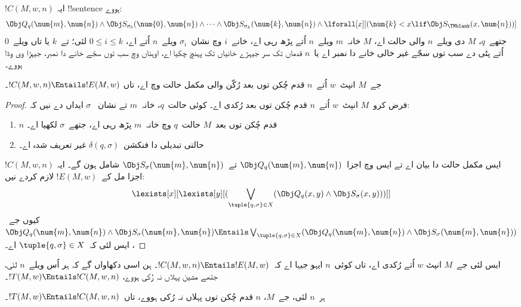 \documentclass[../../../include/open-logic-section]{subfiles}
\begin{document}
\begin{defn} 
$!C(M, w, n)$ ایہ !!{sentence} ہووے:
\[ 
\Obj Q_q(\num{m}, \num{n}) \land \Obj S_{\sigma_0}(\num{0}, \num{n})
\land \dots \land \Obj S_{\sigma_k}(\num{k}, \num{n}) \land
\lforall[x][(\num{k} < x \lif \Obj S_\TMblank(x, \num{n}))]
\] 
جتھے~$q$، $M$ دی ویلے~$n$ والی حالت اے،
$M$ خانہ~$m$ ویلے~$n$ اُتے پڑھ رہی اے، خانے~$i$
وچ نشان~$\sigma_i$ ویلے~$n$ اُتے اے، $0
\le i \le k$ لئی؛ تے~$k$ یا تاں ویلے~$0$
اُتے پٹی دے سب توں سجّے غیر خالی خانے دا نمبر
اے یا~$n$ قدماں تک سر جیہڑے خانیاں تک پہنچ چکیا
اے، اوہناں وچ سب توں سجّے خانے دا نمبر، جیہڑا وی وڈا ہووے۔
\end{defn}

\begin{lem}
جے~$M$ انپٹ~$w$ اُتے~$n$ قدم چُکن
توں بعد رُکّن والی مکمل حالت وچ اے، تاں
$!C(M, w, n) \Entails !E(M, w)$۔
\end{lem}

\begin{proof}
فرض کرو~$M$ انپٹ~$w$ اُتے~$n$ قدم چُکن توں
بعد رُکدی اے۔ کوئی حالت~$q$، خانہ~$m$ تے نشان
~$\sigma$ ایداں دے نیں کہ:
\begin{enumerate} 
\item $n$ قدم چُکن توں بعد~$M$ حالت~$q$ وچ
  خانہ~$m$ پڑھ رہی اے، جتھے~$\sigma$ لکھیا اے۔
\item حالتی تبدیلی دا فنکشن~$\delta(q, \sigma)$
  غیر تعریف شدہ اے۔
\end{enumerate}
$!C(M, w, n)$ ایس مکمل حالت دا بیان اے تے ایس
وچ اجزا~$\Obj Q_{q}(\num{m}, \num{n})$ تے~$\Obj
S_{\sigma}(\num{m}, \num{n})$ شامل ہون گے۔ ایہ
اجزا مل کے~$!E(M,
w)$ لازم کردے نیں:
\[
\lexists[x][\lexists[y][(\bigvee_{\tuple{q, \sigma} \in
      X}(\Obj Q_q(x, y) \land \Obj S_\sigma(x, y)))]]
\]
کیوں جے~$\Obj Q_{q}(\num{m}, \num{n}) \land \Obj S_{\sigma}(\num{m},
\num{n}) \Entails \bigvee_{\tuple{q, \sigma} \in X} (\Obj Q_q(\num{m},
\num{n}) \land \Obj S_{\sigma}(\num{m}, \num{n}))$،
ایس لئی کہ~$\tuple{q,\sigma} \in X$ اے۔
\end{proof}

\begin{explain}
ایس لئی جے~$M$ انپٹ $w$ اُتے رُکدی اے، تاں
کوئی~$n$ ایہو جیہا اے کہ~$!C(M,
w, n) \Entails !E(M,w)$۔ ہن اسی دکھاواں گے
کہ ہر اُس ویلے~$n$ لئی، جتھے مشین پہلاں نہ رُکی
ہووے، $!T(M, w) \Entails !C(M, w, n)$۔
\end{explain}

\begin{lem}
ہر~$n$ لئی، جے~$M$، $n$ قدم چُکن توں پہلاں
نہ رُکی ہووے، تاں~$!T(M, w)
\Entails !C(M, w, n)$۔
\end{lem}
\end{document}
